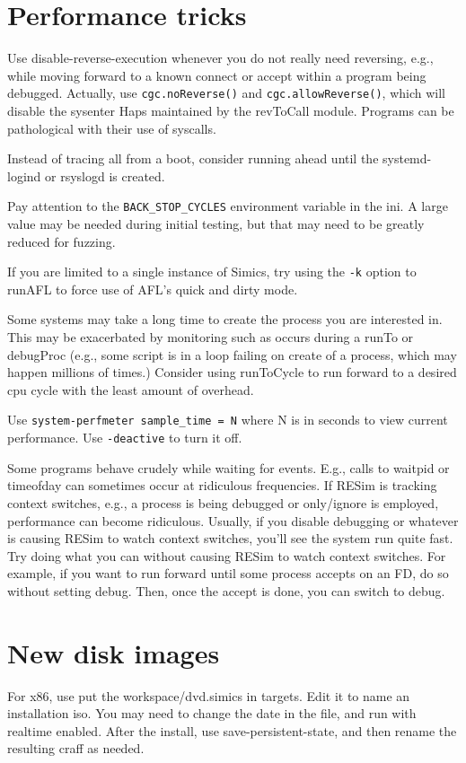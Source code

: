 \documentclass[titlepage]{article}
\begin{document}
\begin{appendices}
\section{Performance tricks}
Use disable-reverse-execution whenever you do not really need reversing, e.g., while moving forward to a known connect or accept
within a program being debugged.  Actually, use {\tt cgc.noReverse()} and {\tt cgc.allowReverse()}, which will disable the sysenter
Haps maintained by the revToCall module.  Programs can be pathological with their use of syscalls.

Instead of tracing all from a boot, consider running ahead until the systemd-logind or rsyslogd is created.

Pay attention to the {\tt BACK\_STOP\_CYCLES} environment variable in the ini.  A large value may be needed during initial testing,
but that may need to be greatly reduced for fuzzing.

If you are limited to a single instance of Simics, try using the {\tt -k} option to runAFL to force use of AFL's quick and dirty mode.

Some systems may take a long time to create the process you are interested in.  This may be exacerbated by monitoring such as occurs during
a runTo or debugProc (e.g., some script is in a loop failing on create of a process, which may happen millions of times.)  Consider using
runToCycle to run forward to a desired cpu cycle with the least amount of overhead.

Use {\tt system-perfmeter sample\_time = N} where N is in seconds to view current performance.  Use {\tt -deactive} to turn it off.

Some programs behave crudely while waiting for events.  E.g., calls to waitpid or timeofday can sometimes occur at ridiculous frequencies.
If RESim is tracking context switches, e.g., a process is being debugged or only/ignore is employed, performance can become ridiculous.
Usually, if you disable debugging or whatever is causing RESim to watch context switches, you'll see the system run quite fast.
Try doing what you can without causing RESim to watch context switches.  For example, if you want to run forward until some process accepts
on an FD, do so without setting debug.  Then, once the accept is done, you can switch to debug.

\section{New disk images}
For x86, use put the workspace/dvd.simics in targets.  Edit it to name an installation iso.  You may need to change the date in
the file, and run with realtime enabled.  After the install, use save-persistent-state, and then rename the resulting craff as
needed.


\end{appendices}
\end{document}
